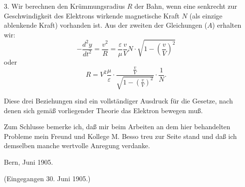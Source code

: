 \documentclass[17pt]{webarticle}       %
\begin{document}
3. Wir berechnen den Krümmungsradius \( R \) der Bahn, wenn eine senkrecht zur Geschwindigkeit des Elektrons wirkende magnetische Kraft \( N \) (als einzige ablenkende Kraft) vorhanden ist. Aus der zweiten der Gleichungen (\( A \)) erhalten wir:
\[
- \frac{d^2 y}{d t^2} = \frac{v^2}{R} = \frac{\varepsilon}{\mu} \frac{v}{V} N \cdot \sqrt{1 - \left( \frac{v}{V} \right)^2}
\]
oder
\[
R = V^2 \frac{\mu}{\varepsilon} \cdot \frac{\frac{v}{V}}{\sqrt{1 - \left( \frac{v}{V} \right)^2}} \cdot \frac{1}{N}.
\]

Diese drei Beziehungen sind ein vollständiger Ausdruck für die Gesetze, nach denen sich gemäß vorliegender Theorie das Elektron bewegen muß.

\bigskip

Zum Schlusse bemerke ich, daß mir beim Arbeiten an dem hier behandelten Probleme mein Freund und Kollege M. Besso treu zur Seite stand und daß ich demselben manche wertvolle Anregung verdanke.

\medskip

Bern, Juni 1905.

\begin{center}
(Eingegangen 30. Juni 1905.)
\end{center}
\end{document}
